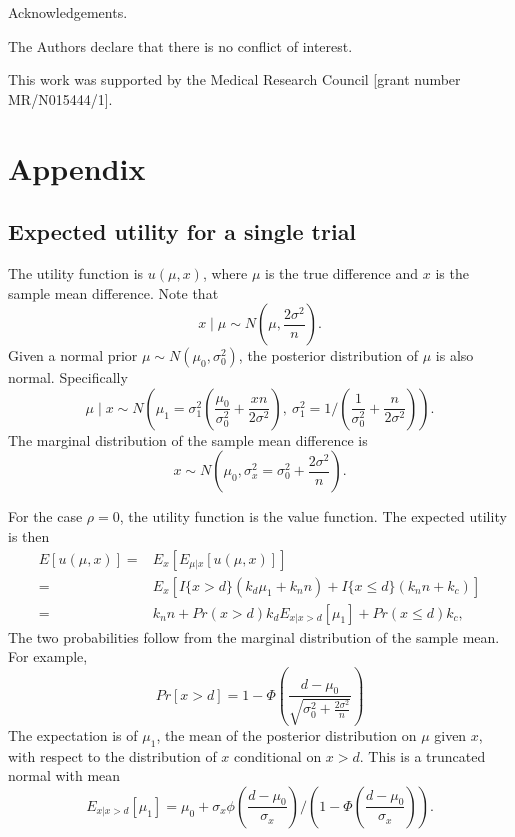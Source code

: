 \documentclass[sagev, Crown]{sagej}
\begin{document}
\begin{acks}
Acknowledgements.
\end{acks}

\begin{dci}
The Authors declare that there is no conflict of interest.
\end{dci}

\begin{funding}
This work was supported by the Medical Research Council [grant number MR/N015444/1].
\end{funding}




\section*{Appendix}

\subsection*{Expected utility for a single trial}

The utility function is $u(\mu, x)$, where $\mu$ is the true difference and $x$ is the sample mean difference. Note that
$$
x \mid \mu \sim N\left(\mu, \frac{2\sigma^2}{n} \right).
$$
Given a normal prior $\mu \sim N(\mu_0, \sigma_0^2)$, the posterior distribution of $\mu$ is also normal. Specifically
$$
\mu \mid x \sim N \left( \mu_1 = \sigma_1^2 \left( \frac{\mu_0}{\sigma_0^2} + \frac{xn}{2\sigma^2} \right), ~ \sigma_1^2 = 1/\left( \frac{1}{\sigma_0^2} + \frac{n}{2\sigma^2} \right) \right).
$$
The marginal distribution of the sample mean difference is
$$
x \sim N\left(\mu_0, \sigma_x^2 = \sigma_0^2 + \frac{2\sigma^2}{n} \right).
$$

For the case $\rho = 0$, the utility function is the value function. The expected utility is then
\begin{align*}
E[u(\mu, x)] =& E_x\left[ E_{\mu | x} [u(\mu, x)] \right] \\
=& E_x \left[ I\{x > d\} (k_d \mu_1 + k_n n) + I\{x \leq d\} (k_n n + k_c) \right] \\
=& k_n n + Pr(x > d) k_d E_{x | x > d} \left[ \mu_1 \right] + Pr(x \leq d)k_c,
\end{align*}
The two probabilities follow from the marginal distribution of the sample mean. For example,
$$
Pr[x > d] = 1- \Phi\left(\frac{d-\mu_0}{\sqrt{\sigma_0^2 + \frac{2\sigma^2}{n}}} \right)
$$
The expectation is of $\mu_1$, the mean of the posterior distribution on $\mu$ given $x$, with respect to the distribution of $x$ conditional on $x > d$. This is a truncated normal with mean
$$
E_{x | x > d} \left[ \mu_1 \right] = \mu_0 + \sigma_x \phi\left(\frac{d - \mu_0}{\sigma_x} \right)/\left(1 - \Phi\left(\frac{d - \mu_0}{\sigma_x}\right) \right).
$$
\end{document}
